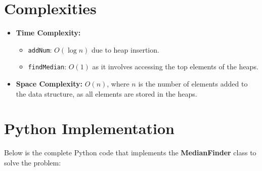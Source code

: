 \section*{Complexities}

\begin{itemize}
    \item \textbf{Time Complexity:}
    \begin{itemize}
        \item \texttt{addNum}: \(O(\log n)\) due to heap insertion.
        \item \texttt{findMedian}: \(O(1)\) as it involves accessing the top elements of the heaps.
    \end{itemize}
    \item \textbf{Space Complexity:} \(O(n)\), where \(n\) is the number of elements added to the data structure, as all elements are stored in the heaps.
\end{itemize}

\section*{Python Implementation}


Below is the complete Python code that implements the \textbf{MedianFinder} class to solve the problem:

